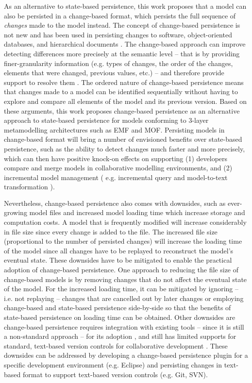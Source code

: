 \documentclass[12pt, a4paper]{report} \usepackage[titletoc]{appendix}
\begin{document}
As an alternative to state-based persistence, this work proposes that a model can also be persisted in a change-based format, which persists the full sequence of \emph{changes} made to the model instead. The concept of change-based persistence is not new and has been used in persisting changes to software, object-oriented databases, and hierarchical documents \cite{DBLP:journals/entcs/RobbesL07,DBLP:conf/sde/LippeO92,DBLP:conf/caise/IgnatN05}. The change-based approach can improve detecting differences more precisely at the semantic level -- that is by providing finer-granularity information (e.g. types of changes, the order of the changes, elements that were changed, previous values, etc.) -- and therefore provide support to resolve them \cite{mens2002state}. The ordered nature of change-based persistence means that changes made to a model can be identified sequentially without having to explore and compare all elements of the model and its previous version. Based on these arguments, this work proposes change-based persistence as an alternative approach to state-based persistence for models conforming to 3-layer metamodelling architectures such as EMF and MOF. Persisting models in change-based format will bring a number of envisioned benefits over state-based persistence, such as the ability to detect changes much faster and more precisely, which can then have positive knock-on effects on supporting (1) developers compare and merge models in collaborative modelling environments, and (2) incremental model management ( e.g. incremental query \cite{DBLP:conf/ecmdafa/RathHV12} and model-to-text transformation \cite{Ogunyomi2018}). 

Nevertheless, change-based persistence also comes with downsides, such as ever-growing model files \cite{DBLP:journals/entcs/RobbesL07,DBLP:conf/edoc/KoegelHLHD10} and increased model loading time \cite{mens2002state} which increase storage and computation costs. A model that is frequently modified will increase considerably in file size since every change is added to the file. The increased file size (proportional to the number of persisted changes) will increase the loading time of the model since all changes have to be replayed to reconstruct the model's eventual state. These downsides have to be mitigated to enable the practical adoption of change-based persistence. One approach to reducing the file size of change-based models is by removing changes that do not affect the eventual state of the model. For the increased loading time, it can be mitigated by ignoring -- i.e. not replaying -- changes that are cancelled out by later changes or employing change-based and state-based persistence side-by-side so that the benefits of state-based persistence on loading time can be obtained. Other downsides are change-based persistence requires integration with existing tools -- since it is still a non-standard approach -- for its adoption \cite{koegel2010emfstore}, and still has limited supports for standard, text-based version controls for collaborative development \cite{koegel2010emfstore}. These downsides can be addressed by developing a change-based persistence plugin for a specific development environment (e.g. Eclipse) and persisting changes in text-based format to support text-based version controls (e.g. Git, SVN).
\end{document}
